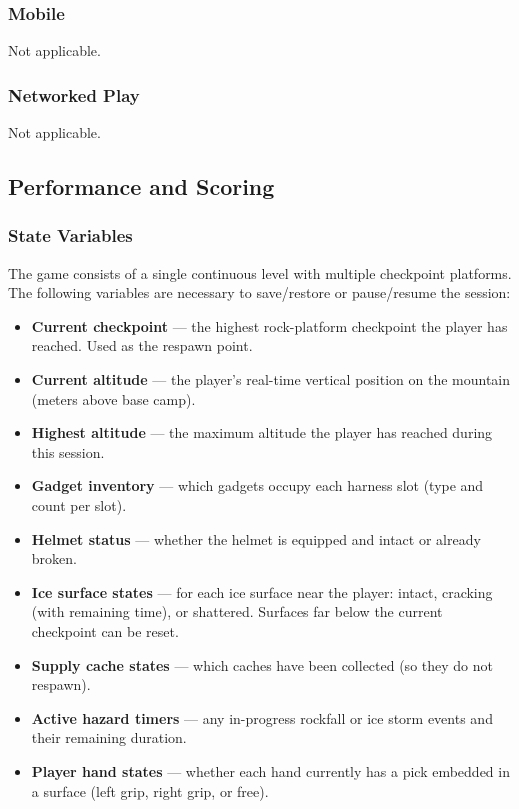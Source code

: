 \documentclass[12pt]{article}
\begin{document}
\subsubsection{Mobile}

Not applicable.

\subsubsection{Networked Play}

Not applicable.

\subsection{Performance and Scoring}

\subsubsection{State Variables}

The game consists of a single continuous level with multiple checkpoint platforms. The following variables are necessary to save/restore or pause/resume the session:

\begin{itemize}[leftmargin=2em]
    \item \textbf{Current checkpoint} --- the highest rock-platform checkpoint the player has reached. Used as the respawn point.
    \item \textbf{Current altitude} --- the player's real-time vertical position on the mountain (meters above base camp).
    \item \textbf{Highest altitude} --- the maximum altitude the player has reached during this session.
    \item \textbf{Gadget inventory} --- which gadgets occupy each harness slot (type and count per slot).
    \item \textbf{Helmet status} --- whether the helmet is equipped and intact or already broken.
    \item \textbf{Ice surface states} --- for each ice surface near the player: intact, cracking (with remaining time), or shattered. Surfaces far below the current checkpoint can be reset.
    \item \textbf{Supply cache states} --- which caches have been collected (so they do not respawn).
    \item \textbf{Active hazard timers} --- any in-progress rockfall or ice storm events and their remaining duration.
    \item \textbf{Player hand states} --- whether each hand currently has a pick embedded in a surface (left grip, right grip, or free).
\end{itemize}
\end{document}
